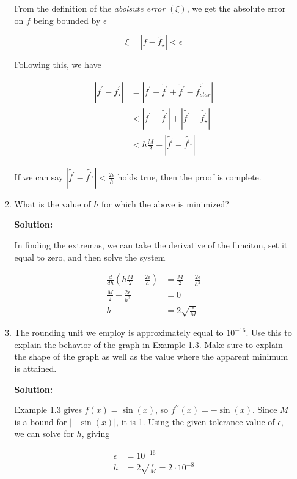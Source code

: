 \documentclass[12pt]{article}
\begin{document}
\begin{enumerate}
\begin{enumerate}
From the definition of the {\em abolsute error} $(\xi)$, we get the absolute error on $f$ being bounded by $\epsilon$

\[
\xi = \left| f - \widetilde{f_{\star}} \right| < \epsilon
\]

Following this, we have

\begin{align*}
\left| f^{\prime} - \widetilde{f^{\prime}_{\star}} \right| &= \left| f^{\prime} - \widetilde{f^{\prime}} + \widetilde{f^{\prime}} -\widetilde{f^{\prime}_{star}} \right|\\
&< \left| f^{\prime} - \widetilde{f^{\prime}} \right| + \left| \widetilde{f^{\prime}} - \widetilde{f^{\prime}_{\star}} \right|\\
&< h\frac{M}{2} + \left| \widetilde{f^{\prime}} - \widetilde{f^{\prime_{\star}}} \right|
\end{align*}

If we can say $\left| \widetilde{f^{\prime}} - \widetilde{f^{\prime_{\star}}} \right| < \frac{2\epsilon}{h}$ holds true, then the proof is complete.

\item What is the value of $h$ for which the above is minimized?

{\bf Solution:}

In finding the extremas, we can take the derivative of the funciton, set it equal to zero, and then solve the system

\begin{align*}
\frac{d}{dh}\left(h\frac{M}{2} + \frac{2\epsilon}{h}\right) &= \frac{M}{2} - \frac{2\epsilon}{h^{2}}\\
\frac{M}{2} - \frac{2\epsilon}{h^{2}} &= 0\\
h &= 2\sqrt{\frac{\epsilon}{M}}
\end{align*}

\item The rounding unit we employ is approximately equal to $10^{-16}$. Use this
to explain the behavior of the graph in Example 1.3. Make sure to explain the shape
of the graph as well as the value where the apparent minimum is attained.

{\bf Solution:}

Example 1.3 gives $f(x) = \sin(x)$, so $f^{\prime\prime}(x) = -\sin(x)$. Since $M$ is a bound
for $\left| -\sin(x)\right|$, it is 1. Using the given tolerance value of $\epsilon$, we can solve
for $h$, giving

\begin{align*}
\epsilon &= 10^{-16}\\
h &= 2\sqrt{\frac{\epsilon}{M}} = 2\cdot 10^{-8}
\end{align*}


\end{enumerate}
\end{enumerate}
\end{document}
